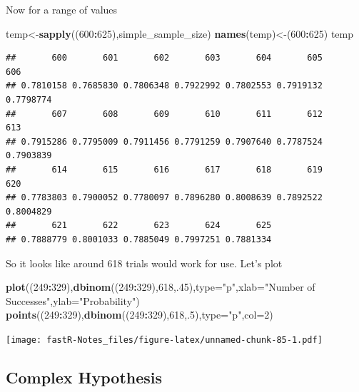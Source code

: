 \documentclass[]{book}
\newenvironment{Shaded}{\begin{snugshade}}{\end{snugshade}}
\newcommand{\KeywordTok}[1]{\textcolor[rgb]{0.13,0.29,0.53}{\textbf{#1}}}
\newcommand{\DataTypeTok}[1]{\textcolor[rgb]{0.13,0.29,0.53}{#1}}
\newcommand{\DecValTok}[1]{\textcolor[rgb]{0.00,0.00,0.81}{#1}}
\newcommand{\StringTok}[1]{\textcolor[rgb]{0.31,0.60,0.02}{#1}}
\newcommand{\OperatorTok}[1]{\textcolor[rgb]{0.81,0.36,0.00}{\textbf{#1}}}
\newcommand{\NormalTok}[1]{#1}
\theoremstyle{definition}
\theoremstyle{definition}
\theoremstyle{definition}
\theoremstyle{remark}
\begin{document}
Now for a range of values

\begin{Shaded}
\begin{Highlighting}[]
\NormalTok{temp<-}\KeywordTok{sapply}\NormalTok{((}\DecValTok{600}\OperatorTok{:}\DecValTok{625}\NormalTok{),simple_sample_size)}
\KeywordTok{names}\NormalTok{(temp)<-(}\DecValTok{600}\OperatorTok{:}\DecValTok{625}\NormalTok{)}
\NormalTok{temp    }
\end{Highlighting}
\end{Shaded}

\begin{verbatim}
##       600       601       602       603       604       605       606 
## 0.7810158 0.7685830 0.7806348 0.7922992 0.7802553 0.7919132 0.7798774 
##       607       608       609       610       611       612       613 
## 0.7915286 0.7795009 0.7911456 0.7791259 0.7907640 0.7787524 0.7903839 
##       614       615       616       617       618       619       620 
## 0.7783803 0.7900052 0.7780097 0.7896280 0.8008639 0.7892522 0.8004829 
##       621       622       623       624       625 
## 0.7888779 0.8001033 0.7885049 0.7997251 0.7881334
\end{verbatim}

So it looks like around 618 trials would work for use. Let's plot

\begin{Shaded}
\begin{Highlighting}[]
\KeywordTok{plot}\NormalTok{((}\DecValTok{249}\OperatorTok{:}\DecValTok{329}\NormalTok{),}\KeywordTok{dbinom}\NormalTok{((}\DecValTok{249}\OperatorTok{:}\DecValTok{329}\NormalTok{),}\DecValTok{618}\NormalTok{,.}\DecValTok{45}\NormalTok{),}\DataTypeTok{type=}\StringTok{"p"}\NormalTok{,}\DataTypeTok{xlab=}\StringTok{"Number of Successes"}\NormalTok{,}\DataTypeTok{ylab=}\StringTok{"Probability"}\NormalTok{)}
\KeywordTok{points}\NormalTok{((}\DecValTok{249}\OperatorTok{:}\DecValTok{329}\NormalTok{),}\KeywordTok{dbinom}\NormalTok{((}\DecValTok{249}\OperatorTok{:}\DecValTok{329}\NormalTok{),}\DecValTok{618}\NormalTok{,.}\DecValTok{5}\NormalTok{),}\DataTypeTok{type=}\StringTok{"p"}\NormalTok{,}\DataTypeTok{col=}\DecValTok{2}\NormalTok{)}
\end{Highlighting}
\end{Shaded}

\texttt{[image: fastR-Notes\_files/figure-latex/unnamed-chunk-85-1.pdf]}

\subsection{Complex Hypothesis}\label{complex-hypothesis}
\end{document}
